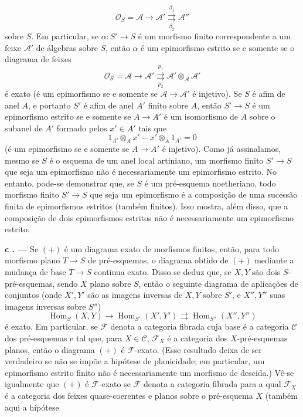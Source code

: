 \documentclass[11pt,twoside,openany]{book}
\numberwithin{equation}{section}
\newcommand{\src}[1]{%
  \phantomsection\hypertarget{src:#1}{}%
  \marginpar{\raggedleft\footnotesize\sffamily #1}%
}
\theoremstyle{plain}
\theoremstyle{definition}
\theoremstyle{remark}
\newcommand{\result}[2]{%
  \par\medskip\noindent\textbf{#1%
  \if\relax\detokenize{#2}\relax\else\space#2\fi. ---}\enspace
}
\newcommand{\FgaUnitKey}{frontmatter}
\renewcommand{\src}[1]{%
  \phantomsection\hypertarget{src:\FgaUnitKey:#1}{}%
  \marginpar{\raggedleft\footnotesize\sffamily #1}%
}
\begin{document}
\src{306}
\[
  \mathcal O_S=\mathcal A\longrightarrow\mathcal A'
  \overset{\beta_1}{\underset{\beta_2}{\rightrightarrows}}\mathcal A''
\]
sobre $S$. Em particular, se $\alpha:S'\longrightarrow S$ é um morfismo
finito correspondente a um feixe $\mathcal A'$ de álgebras sobre $S$, então
$\alpha$ é um epimorfismo estrito se e somente se o diagrama de feixes
\[
  \mathcal O_S=\mathcal A\longrightarrow\mathcal A'
  \overset{p_1}{\underset{p_2}{\rightrightarrows}}
  \mathcal A'\otimes_{\mathcal A}\mathcal A'
\]
é exato (é um epimorfismo se e somente se
$\mathcal A\longrightarrow\mathcal A'$ é injetivo). Se $S$ é afim de anel
$A$, e portanto $S'$ é afim de anel $A'$ finito sobre $A$, então
$S'\longrightarrow S$ é um epimorfismo estrito se e somente se
$A\longrightarrow A'$ é um isomorfismo de $A$ sobre o subanel de $A'$
formado pelos $x'\in A'$ tais que
\[
  1_{A'}\otimes_Ax'-x'\otimes_A1_{A'}=0
\]
(é um epimorfismo se e somente se $A\longrightarrow A'$ é injetivo). Como já
assinalamos, mesmo se $S$ é o esquema de um anel local artiniano, um
morfismo finito $S'\longrightarrow S$ que seja um epimorfismo não é
necessariamente um epimorfismo estrito. No entanto, pode-se demonstrar que, se
$S$ é um pré-esquema noetheriano, todo morfismo finito
$S'\longrightarrow S$ que seja um epimorfismo é a composição de uma sucessão
finita de epimorfismos estritos (também finitos). Isso mostra, além disso, que
a composição de dois epimorfismos estritos não é necessariamente um
epimorfismo estrito.

\result{c}{} Se $(+)$ é um diagrama exato de morfismos finitos, então,
para todo morfismo plano $T\longrightarrow S$ de pré-esquemas, o diagrama
obtido de $(+)$ mediante a mudança de base $T\longrightarrow S$ continua
exato. Disso se deduz que, se $X,Y$ são dois $S$-pré-esquemas, sendo $X$
plano sobre $S$, então o seguinte diagrama de aplicações de conjuntos
(onde $X',Y'$ são as imagens inversas de $X,Y$ sobre $S'$, e $X'',Y''$ suas
imagens inversas sobre $S''$)
\[
  \operatorname{Hom}_S(X,Y)\longrightarrow
  \operatorname{Hom}_{S'}(X',Y')
  \rightrightarrows
  \operatorname{Hom}_{S''}(X'',Y'')
\]
é exato. Em particular, se $\mathcal F$ denota a categoria fibrada cuja base
é a categoria $\mathcal C$ dos pré-esquemas e tal que, para
$X\in\mathcal C$, $\mathcal F_X$ é a categoria dos $X$-pré-esquemas
planos, então o diagrama $(+)$ é $\mathcal F$-exato. (Esse resultado deixa
de ser verdadeiro se não se impõe a hipótese de planicidade; em particular, um
epimorfismo estrito finito não é necessariamente um morfismo de descida.)
Vê-se igualmente que $(+)$ é $\mathcal F$-exato se $\mathcal F$ denota a
categoria fibrada para a qual $\mathcal F_X$ é a categoria dos feixes
quase-coerentes e planos sobre o pré-esquema $X$ (também aqui a hipótese
\end{document}
